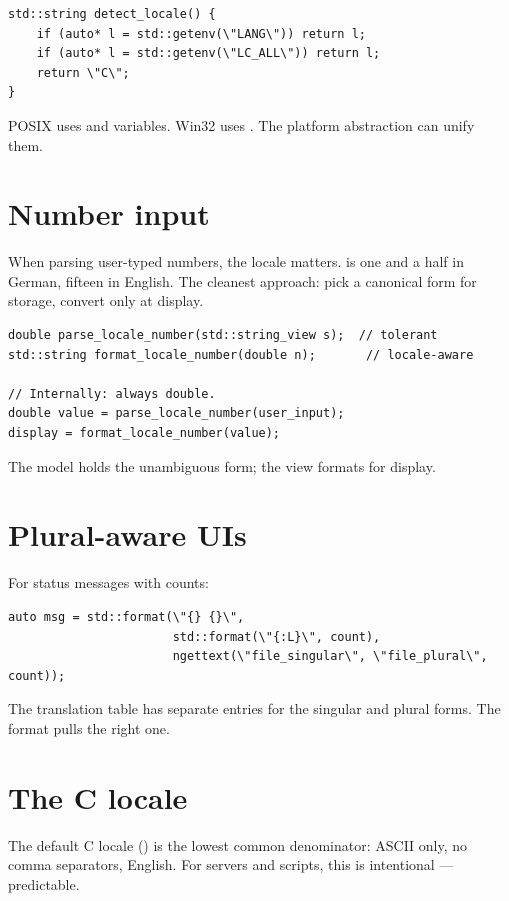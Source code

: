 \begin{lstlisting}
std::string detect_locale() {
    if (auto* l = std::getenv(\"LANG\")) return l;
    if (auto* l = std::getenv(\"LC_ALL\")) return l;
    return \"C\";
}
\end{lstlisting}

POSIX uses  and  variables. Win32 uses
. The platform abstraction can
unify them.

\section{Number input}

When parsing user-typed numbers, the locale matters. 
is one and a half in German, fifteen in English. The cleanest
approach: pick a canonical form for storage, convert only at
display.

\begin{lstlisting}
double parse_locale_number(std::string_view s);  // tolerant
std::string format_locale_number(double n);       // locale-aware

// Internally: always double.
double value = parse_locale_number(user_input);
display = format_locale_number(value);
\end{lstlisting}

The model holds the unambiguous form; the view formats for
display.

\section{Plural-aware UIs}

For status messages with counts:

\begin{lstlisting}
auto msg = std::format(\"{} {}\",
                       std::format(\"{:L}\", count),
                       ngettext(\"file_singular\", \"file_plural\", count));
\end{lstlisting}

The translation table has separate entries for the singular and
plural forms. The format pulls the right one.

\section{The C locale}

The default C locale () is the lowest common
denominator: ASCII only, no comma separators, English. For
servers and scripts, this is intentional --- predictable.

